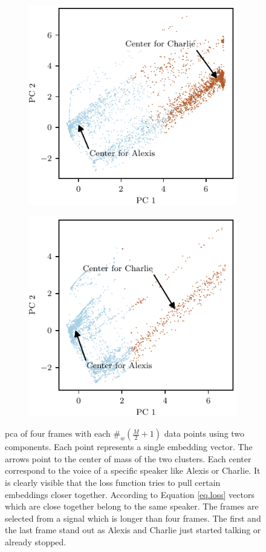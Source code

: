 \begin{figure}
\begin{subfigure}{0.5\textwidth}
		\includegraphics{figure/pca/pca7.pdf}
	\end{subfigure}%
	\begin{subfigure}{0.5\textwidth}
		\centering
		\includegraphics{figure/pca/pca10.pdf}
	\end{subfigure}%
	\caption{\gls{pca} of four frames with each $\#_w (\frac{M}{2}+1)$ data points using two components. Each point represents a single embedding vector.
	The arrows point to the center of mass of the two clusters. Each center correspond to the voice of a specific speaker like Alexis or Charlie. It is clearly visible that the loss function tries to pull certain embeddings closer together. According to Equation \ref{eq.loss} vectors which are close together belong to the same speaker.
	The frames are selected from a signal which is longer than four frames. The first and the last frame stand out as Alexis and Charlie just started talking or already stopped.}
	\label{fig.clustering-pca}
\end{figure}

